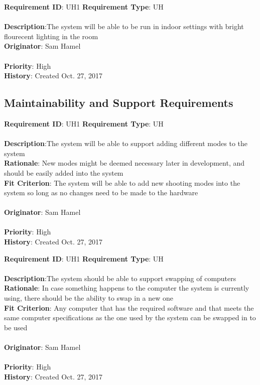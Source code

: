 \documentclass[11pt]{article}
\begin{document}
\begin{framed}
	\noindent\textbf{Requirement ID}: UH1 \hfill \textbf{Requirement Type}: UH \hfill\\\\
	\noindent\textbf{Description}:The system will be able to be run in indoor settings with bright flourecent lighting in the room\\
	\textbf{Originator}: Sam Hamel \\\\
	\textbf{Priority}: High \hfill \\
	\noindent\textbf{History}: Created Oct. 27, 2017
\end{framed}


\subsection{Maintainability and Support Requirements}
\begin{framed}
	\noindent\textbf{Requirement ID}: UH1 \hfill \textbf{Requirement Type}: UH \hfill\\\\
	\noindent\textbf{Description}:The system will be able to support adding different modes to the system\\
	\textbf{Rationale}: New modes might be deemed necessary later in development, and should be easily added into the system\\
	\textbf{Fit Criterion}: The system will be able to add new shooting modes into the system so long as no changes need to be made to the hardware \\\\
	\textbf{Originator}: Sam Hamel \\\\
	\textbf{Priority}: High \hfill \\
	\noindent\textbf{History}: Created Oct. 27, 2017
\end{framed}
\begin{framed}
	\noindent\textbf{Requirement ID}: UH1 \hfill \textbf{Requirement Type}: UH \hfill\\\\
	\noindent\textbf{Description}:The system should be able to support swapping of computers\\
	\textbf{Rationale}: In case something happens to the computer the system is currently using, there should be the ability to swap in a new one\\
	\textbf{Fit Criterion}: Any computer that has the required software and that meets the same computer specifications as the one used by the system can be swapped in to be used\\\\
	\textbf{Originator}: Sam Hamel \\\\
	\textbf{Priority}: High \hfill \\
	\noindent\textbf{History}: Created Oct. 27, 2017
\end{framed}
\end{document}
